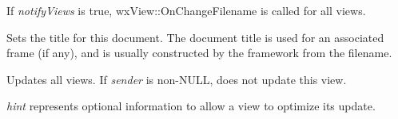 If {\it notifyViews} is true, wxView::OnChangeFilename is called for all views.

\label{wxdocumentsettitle}


Sets the title for this document. The document title is used for an associated
frame (if any), and is usually constructed by the framework from
the filename.

\label{wxdocumentupdateallviews}


Updates all views. If {\it sender} is non-NULL, does not update this view.

{\it hint} represents optional information to allow a view to optimize its update.

